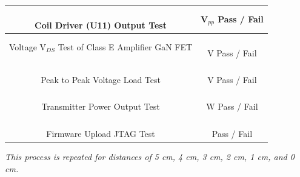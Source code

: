 \documentclass[12pt]{article}
\begin{document}
\begin{appendices}
\begin{table}[h!]
\begin{tabular}{ | c | c | }
\hline
\parbox{0.5\linewidth}{\raggedright \hfill \\[-0.25 em]
Coil Driver (U11) Output Test 
\hfill \\[0.1 em]} &  \parbox{0.4\linewidth}{\raggedright \hfill \\ [0.7 em]\underline{\hspace{0.625in}}
 V$_{pp}$
\hspace{0.125 in}Pass \space / \space  Fail \hfill \\ [0.3 em]} \\ 
\hline
\parbox{0.5\linewidth}{\raggedright \hfill \\[-0.25 em]
Voltage V$_{DS}$ Test of Class E Amplifier GaN FET \hfill \\[0.1 em]
} &  \parbox{0.4\linewidth}{\raggedright \hfill \\ [0.7 em]
\underline{\hspace{0.625in}} V  \hspace{0.125 in}Pass \space / \space  Fail \hfill \\ [0.3 em]
} \\ 
\hline
\parbox{0.5\linewidth}{\raggedright \hfill \\[-0.25 em]
Peak to Peak Voltage Load Test
\hfill \\[0.1 em]} &  \parbox{0.4\linewidth}{\raggedright \hfill \\ [0.7 em]\underline{\hspace{0.625in}}
 V 
\hspace{0.125 in}Pass \space / \space  Fail \hfill \\ [0.3 em]} \\ 
\hline
\parbox{0.5\linewidth}{\raggedright \hfill \\[-0.25 em]
Transmitter Power Output Test\hfill \\[0.1 em]
} &  \parbox{0.4\linewidth}{\raggedright \hfill \\ [0.7 em]\underline{\hspace{0.625in}}
 W 
\hspace{0.125 in}Pass \space / \space  Fail \hfill \\ [0.3 em]} \\ 
\hline
\parbox{0.5\linewidth}{\raggedright \hfill \\[-0.25 em]
Firmware Upload JTAG Test\hfill \\[0.1 em]
} &  \parbox{0.4\linewidth}{\centering \hfill \\ [0.7 em]
\hspace{0.125 in}Pass \space / \space  Fail \hfill \\ [0.3 em]
} \\ 
\hline
\end{tabular}
\end{table}
\noindent
\textit{This process is repeated for distances of 5 cm, 4 cm, 3 cm, 2 cm, 1 cm, and 0 cm.}


\end{appendices}
\end{document}
